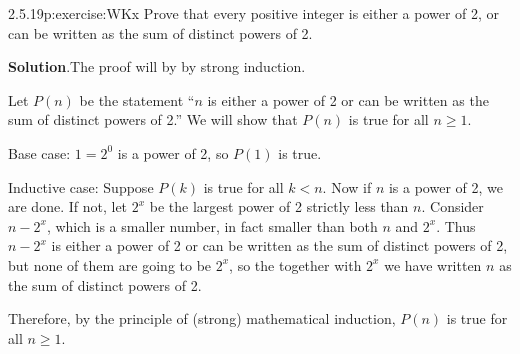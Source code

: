 \documentclass[twoside,11pt,]{book}
\newcommand{\blocktitlefont}{\relax}
\numberwithin{equation}{chapter}
\newcommand{\lt}{<}
\begin{document}
\begin{divisionsolution}{2.5.19}{}{p:exercise:WKx}%
Prove that every positive integer is either a power of 2, or can be written as the sum of distinct powers of 2.%
\par\smallskip%
\noindent\textbf{\blocktitlefont Solution}.\quad{}The proof will by by strong induction.%
\begin{solutionproof}
Let \(P(n)\) be the statement ``\(n\) is either a power of 2 or can be written as the sum of distinct powers of 2.'' We will show that \(P(n)\) is true for all \(n \ge 1\).%
\par
Base case: \(1 = 2^0\) is a power of 2, so \(P(1)\) is true.%
\par
Inductive case: Suppose \(P(k)\) is true for all \(k \lt n\). Now if \(n\) is a power of 2, we are done. If not, let \(2^x\) be the largest power of 2 strictly less than \(n\). Consider \(n - 2^x\), which is a smaller number, in fact smaller than both \(n\) and \(2^x\). Thus \(n-2^x\) is either a power of 2 or can be written as the sum of distinct powers of 2, but none of them are going to be \(2^x\), so the together with \(2^x\) we have written \(n\) as the sum of distinct powers of 2.%
\par
Therefore, by the principle of (strong) mathematical induction, \(P(n)\) is true for all \(n \ge 1\).%
\end{solutionproof}
\end{divisionsolution}%
\end{document}
